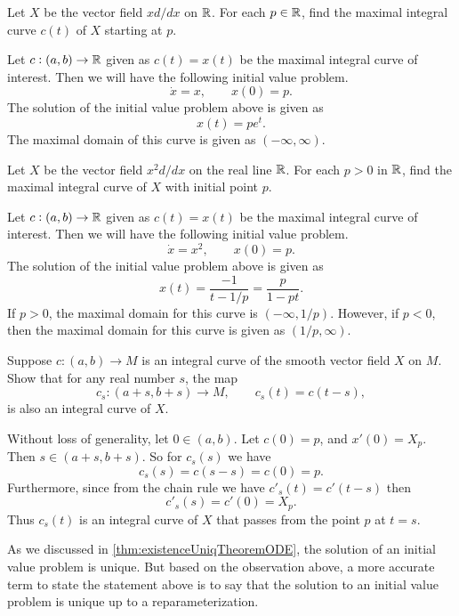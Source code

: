 \begin{problem}
	Let $ X $ be the vector field $ x d/dx $ on $ \mathbb{R} $. For each $ p \in \mathbb{R} $, find the maximal integral curve $ c(t) $ of $ X $ starting at $ p $.
\end{problem}
\begin{solution}
	Let $ c: (a,b) \to \mathbb{R}$ given as $ c(t) = x(t) $ be the maximal integral curve of interest. Then we will have the following initial value problem.
	\[ \dot{x} = x, \qquad x(0) = p.\]
	The solution of the initial value problem above is given as
	\[ x(t) = p e^t. \]
	The maximal domain of this curve is given as $ (-\infty,\infty) $.
\end{solution}

\begin{problem}
	Let $ X $ be the vector field $ x^2 d/dx $ on the real line $ \mathbb{R} $. For each $ p > 0 $ in $ \mathbb{R} $, find the maximal integral curve of $ X $ with initial point $ p $.
\end{problem}
\begin{solution}
	Let $ c: (a,b) \to \mathbb{R}$ given as $ c(t) = x(t) $ be the maximal integral curve of interest. Then we will have the following initial value problem.
	\[ \dot{x} = x^2, \qquad x(0) = p. \]
	The solution of the initial value problem above is given as 
	\[ x(t) = \frac{-1}{t - 1/p} = \frac{p}{1-pt}.  \]
	If $ p > 0 $, the maximal domain for this curve is $ (-\infty, 1/p) $. However, if $ p < 0 $, then the maximal domain for this curve is given as $ (1/p,\infty) $.
\end{solution}

\begin{problem}
	Suppose $ c: (a,b) \to M $ is an integral curve of the smooth vector field $ X $ on $ M $. Show that for any real number $ s $, the map
	\[ c_s: (a+s,b+s) \to M, \qquad c_s(t) = c(t-s), \] 
	is also an integral curve of $ X $.
\end{problem}
\begin{solution}
	Without loss of generality, let $ 0 \in (a,b) $. Let $ c(0) = p $, and $ x'(0) = X_p $. Then $ s \in (a+s, b+s) $. So for $ c_s(s) $ we have
	\[ c_s(s) = c(s-s) = c(0) = p. \]
	Furthermore, since from the chain rule we have $ c'_s(t) = c'(t-s) $ then 
	\[ c'_s(s) = c'(0) = X_p. \]
	Thus $ c_s(t) $ is an integral curve of $ X $ that passes from the point $ p $ at $ t = s $.
	\begin{observation}
		As we discussed in \autoref{thm:existenceUniqTheoremODE}, the solution of an initial value problem is unique. But based on the observation above, a more accurate term to state the statement above is to say that the solution to an initial value problem is unique up to a reparameterization.
	\end{observation}
\end{solution}

